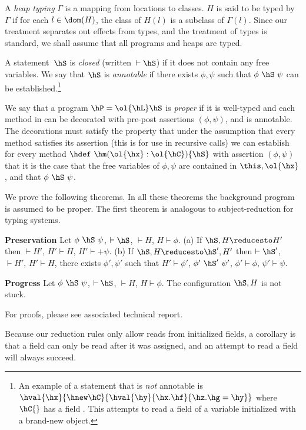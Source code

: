 A {\em heap typing} $\Gamma$ is a mapping from locations to classes. $H$ is
said to be typed by $\Gamma$ if for each $l\in\dom(H)$, the class of $H(l)$
is a subclass of $\Gamma(l)$.  Since our treatment separates out effects
from types, and the treatment of types is standard, we shall assume
that all programs and heaps are typed.

A statement~$\hS$ is \emph{closed} (written~$\vdash \hS$) if it does not contain any free variables.
We say that $\hS$ is \emph{annotable} if there exists $\phi,\psi$ such that
$\phi~\hS~\psi$ can be established.\footnote{An example of a statement that is
{\em not} annotable is $\hval{\hx}{\hnew
  \hC}{\hval{\hy}{\hx.\hf}{\hz.\hg=\hy}}$ where $\hC{}$ has a field
\hf. This attempts to read a field of a variable initialized with a
brand-new object.}

We say that a program $\hP=\ol{\hL}\hS$ is {\em proper} if it is
well-typed and each method in \hL{} can be decorated with pre-post assertions
$(\phi,\psi)$, and \hS is annotable.
The decorations must satisfy the property that under the
assumption that every method satisfies its assertion (this is for use
in recursive calls) we can establish for every method
$\hdef~\hm(\ol{\hx}:\ol{\hC})\{\hS\}$ with assertion $(\phi,\psi)$ that
it is the case that the free variables of $\phi,\psi$ are contained in
$\this,\ol{\hx}$, and that $\phi~\hS~\psi$.

We prove the following theorems. In all these theorems the background
program \hP{} is assumed to be proper. The first theorem is analogous
to subject-reduction for typing systems.
\begin{Theorem}{\textbf{Preservation}}
Let $\phi~\hS~\psi$, $\vdash \hS$, $\vdash H$, $H \vdash \phi$.
(a) If $\hS,H \reducesto H'$ then $\vdash H'$, $H' \vdash H$, $H' \vdash +\psi$.
(b) If $\hS,H \reducesto \hS',H'$ then $\vdash \hS'$, $\vdash H'$, $H' \vdash H$,
there exists $\phi',\psi'$ such
that $H' \vdash \phi'$, $\phi'~\hS'~\psi'$, $\phi' \vdash \phi$, $\psi' \vdash \psi$.
\end{Theorem}

\begin{Theorem}{\textbf{Progress}}
Let $\phi~\hS~\psi$, $\vdash \hS$, $\vdash H$, $H \vdash \phi$.
The configuration $\hS,H$ is not stuck.
\end{Theorem}

For proofs, please see associated technical report.

Because our reduction rules only allow reads from initialized fields,
a corollary is that a field can only be read after it was assigned,
and an attempt to read a field will always succeed.
